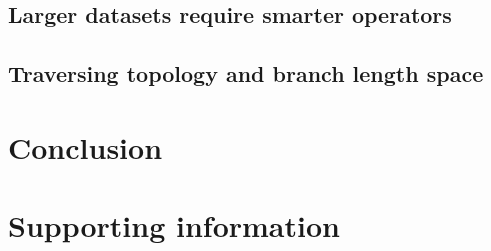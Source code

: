 \documentclass[10pt,letterpaper]{article}
\begin{document}
	
\subsection*{Larger datasets require smarter operators}

\subsection*{Traversing topology and branch length space}










\section*{Conclusion}



\newpage
\section*{Supporting information}
\end{document}

